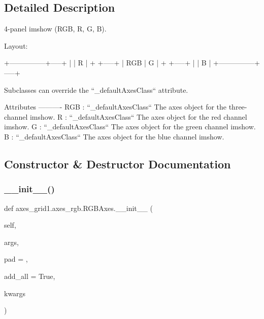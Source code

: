 \subsection{Detailed Description}
\begin{DoxyVerb}4-panel imshow (RGB, R, G, B).

Layout:

    +---------------+-----+
    |               |  R  |
    +               +-----+
    |      RGB      |  G  |
    +               +-----+
    |               |  B  |
    +---------------+-----+

Subclasses can override the ``_defaultAxesClass`` attribute.

Attributes
----------
RGB : ``_defaultAxesClass``
    The axes object for the three-channel imshow.
R : ``_defaultAxesClass``
    The axes object for the red channel imshow.
G : ``_defaultAxesClass``
    The axes object for the green channel imshow.
B : ``_defaultAxesClass``
    The axes object for the blue channel imshow.
\end{DoxyVerb}
 

\subsection{Constructor \& Destructor Documentation}
\mbox{\label{classaxes__grid1_1_1axes__rgb_1_1RGBAxes_a430b4350a6db1197c3210f4249cbc906}} 
\subsubsection{\texorpdfstring{\+\_\+\+\_\+init\+\_\+\+\_\+()}{\_\_init\_\_()}}
{\footnotesize\ttfamily def axes\+\_\+grid1.\+axes\+\_\+rgb.\+R\+G\+B\+Axes.\+\_\+\+\_\+init\+\_\+\+\_\+ (\begin{DoxyParamCaption}\item[{}]{self,  }\item[{}]{args,  }\item[{}]{pad = {},  }\item[{}]{add\+\_\+all = {\ttfamily True},  }\item[{}]{kwargs }\end{DoxyParamCaption})}

